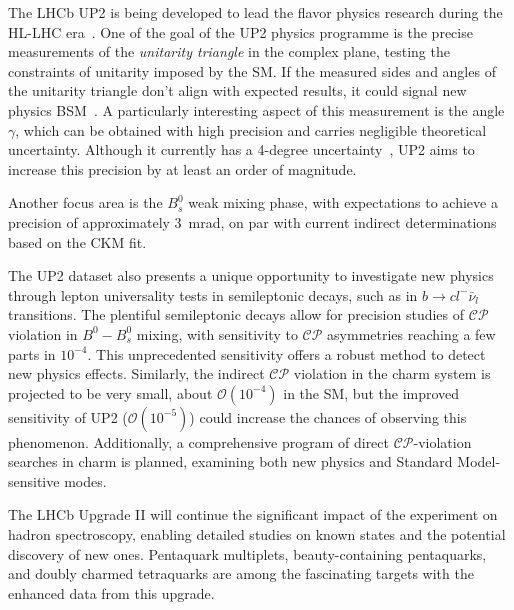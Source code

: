 The LHCb UP2 is being developed to lead the flavor physics research during the HL-LHC era~\cite{lhcbcollaboration2019physics}. 
One of the goal of the UP2 physics programme is the precise measurements of the \textit{unitarity triangle} in the complex plane, testing the constraints of unitarity imposed by the SM. If the measured sides and angles of the unitarity triangle don't align with expected results, it could signal new physics BSM~\cite{PhysRevLett.10.531, 10.1143/PTP.49.652}.
A particularly interesting aspect of this measurement is the angle $\gamma$, which can be obtained with high precision and carries negligible theoretical uncertainty. Although it currently has a 4-degree uncertainty~\cite{LHCb:2021dcr}, UP2 aims to increase this precision by at least an order of magnitude. 

Another focus area is the $B_s^0$ weak mixing phase, with expectations to achieve a precision of approximately \SI{3}{\milli\radian}, on par with current indirect determinations based on the CKM fit.

The UP2 dataset also presents a unique opportunity to investigate new physics through lepton universality tests in semileptonic decays, such as in $b\rightarrow c l^-\bar{\nu}_l$ transitions. The plentiful semileptonic decays allow for precision studies of $\mathcal{CP}$ violation in $B^0-B^0_s$ mixing, with sensitivity to $\mathcal{CP}$ asymmetries reaching a few parts in $10^{−4}$. This unprecedented sensitivity offers a robust method to detect new physics effects. Similarly, the indirect $\mathcal{CP}$ violation in the charm system is projected to be very small, about $\mathcal{O}(10^{-4})$ in the SM, but the improved sensitivity of UP2 ($\mathcal{O}(10^{−5})$) could increase the chances of observing this phenomenon. Additionally, a comprehensive program of direct $\mathcal{CP}$-violation searches in charm is planned, examining both new physics and Standard Model-sensitive modes.

The LHCb Upgrade II will continue the significant impact of the experiment on hadron spectroscopy, enabling detailed studies on known states and the potential discovery of new ones. Pentaquark multiplets, beauty-containing pentaquarks, and doubly charmed tetraquarks are among the fascinating targets with the enhanced data from this upgrade.



